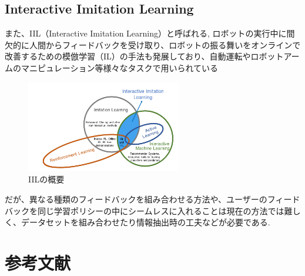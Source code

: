 \documentclass[a4j, twocolumn, 10pt,pdflatex,ja=standard]{bxjsarticle}
\begin{document}
\subsection{Interactive Imitation Learning}
また、IIL（Interactive Imitation Learning）と呼ばれる, ロボットの実行中に間欠的に人間からフィードバックを受け取り、ロボットの振る舞いをオンラインで改善するための模倣学習（IL）の手法も発展しており、自動運転やロボットアームのマニピュレーション等様々なタスクで用いられている\cite{iil}
\begin{figure}[htbp]
 \begin{center}
 \includegraphics[height=4cm]{./figure/iil.png}
 \caption{IILの概要}
 \end{center}
\end{figure}

だが、異なる種類のフィードバックを組み合わせる方法や、ユーザーのフィードバックを同じ学習ポリシーの中にシームレスに入れることは現在の方法では難しく、データセットを組み合わせたり情報抽出時の工夫などが必要である. 


\section{参考文献}
\end{document}
